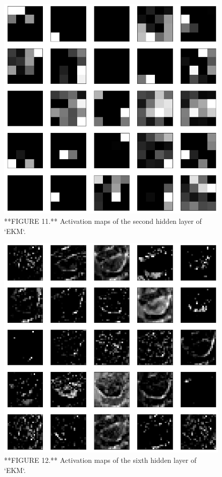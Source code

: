 \documentclass[]{article}
\begin{document}
\begin{figure}

{\centering \includegraphics[width=9.5in]{Images/FeatureMaps2} 

}

\caption{**FIGURE 11.** Activation maps of the second hidden layer of `EKM`.}\label{fig:maps2}
\end{figure}
\begin{figure}

{\centering \includegraphics[width=9.5in]{Images/FeatureMaps6} 

}

\caption{**FIGURE 12.** Activation maps of the sixth hidden layer of `EKM`.}\label{fig:maps6}
\end{figure}
\end{document}
